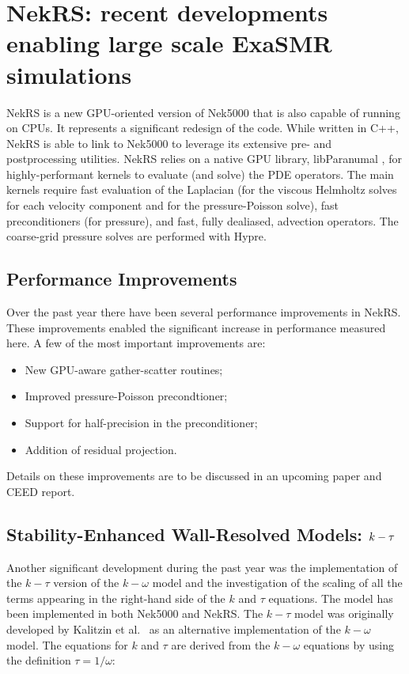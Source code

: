 \section{NekRS: recent developments enabling large scale ExaSMR simulations}
\label{sec:nekrs}

NekRS is a new GPU-oriented version of Nek5000  that is also capable of running
on CPUs. It represents a significant redesign of the code. While written in
C++, NekRS is able to link to Nek5000 to leverage its extensive pre- and
postprocessing utilities. NekRS relies on a native GPU library,
libParanumal \cite{libP}, for highly-performant kernels to evaluate (and
solve) the PDE operators.  The main kernels require fast evaluation of the
Laplacian (for the viscous Helmholtz solves for each velocity component and
for the pressure-Poisson solve), fast preconditioners (for pressure), and
fast, fully dealiased, advection operators.  The coarse-grid pressure solves
are performed with Hypre.

\subsection{Performance Improvements}

Over the past year there have been several performance improvements in NekRS. These improvements enabled the significant increase in performance measured here.
A few of the most important improvements are:
\begin{itemize}
  \item New GPU-aware gather-scatter routines;
  \item Improved pressure-Poisson precondtioner;
  \item Support for half-precision in the preconditioner;
  \item Addition of residual projection.
\end{itemize}
Details on these improvements are to be discussed in an upcoming paper and CEED report.

\subsection{Stability-Enhanced Wall-Resolved Models: $\lowercase{k}-\tau$}
Another significant development during the past year was the implementation of the $k-\tau$
version of the $k-\omega$ model and the investigation of the scaling of all the terms appearing in
the right-hand side of the $k$ and $\tau$ equations. The model has been implemented in both Nek5000 and NekRS. The $k-\tau$ model was originally developed by Kalitzin et al.~\cite{benton01} as an alternative
implementation of the $k-\omega$ model. The equations for $k$ and $\tau$ are derived from the $k-\omega$
equations by using the definition $\tau=1/\omega$:

